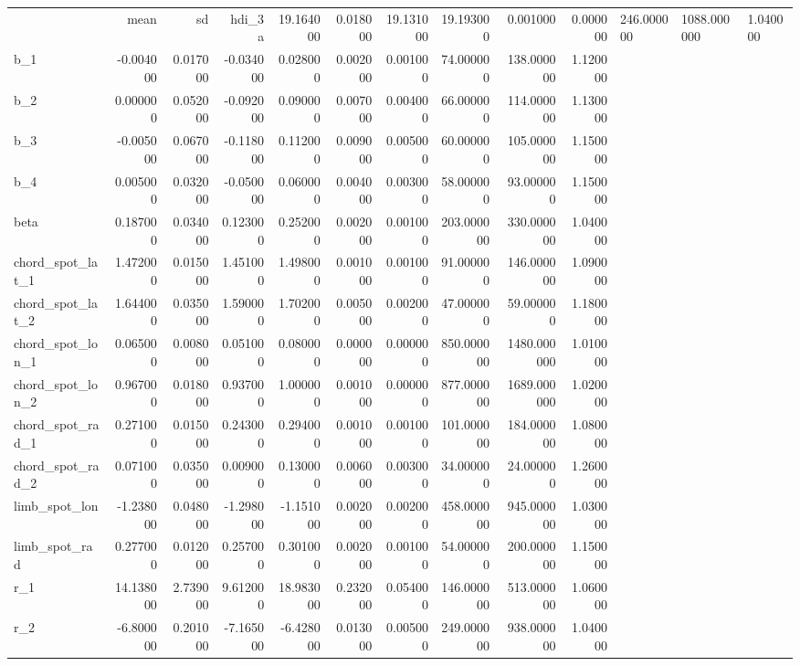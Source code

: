 \begin{tabular}{lrrrrrrrrr}
\toprule
 & mean & sd & hdi_3%
\midrule
a & 19.164000 & 0.018000 & 19.131000 & 19.193000 & 0.001000 & 0.000000 & 246.000000 & 1088.000000 & 1.040000 \\
b_1 & -0.004000 & 0.017000 & -0.034000 & 0.028000 & 0.002000 & 0.001000 & 74.000000 & 138.000000 & 1.120000 \\
b_2 & 0.000000 & 0.052000 & -0.092000 & 0.090000 & 0.007000 & 0.004000 & 66.000000 & 114.000000 & 1.130000 \\
b_3 & -0.005000 & 0.067000 & -0.118000 & 0.112000 & 0.009000 & 0.005000 & 60.000000 & 105.000000 & 1.150000 \\
b_4 & 0.005000 & 0.032000 & -0.050000 & 0.060000 & 0.004000 & 0.003000 & 58.000000 & 93.000000 & 1.150000 \\
beta & 0.187000 & 0.034000 & 0.123000 & 0.252000 & 0.002000 & 0.001000 & 203.000000 & 330.000000 & 1.040000 \\
chord_spot_lat_1 & 1.472000 & 0.015000 & 1.451000 & 1.498000 & 0.001000 & 0.001000 & 91.000000 & 146.000000 & 1.090000 \\
chord_spot_lat_2 & 1.644000 & 0.035000 & 1.590000 & 1.702000 & 0.005000 & 0.002000 & 47.000000 & 59.000000 & 1.180000 \\
chord_spot_lon_1 & 0.065000 & 0.008000 & 0.051000 & 0.080000 & 0.000000 & 0.000000 & 850.000000 & 1480.000000 & 1.010000 \\
chord_spot_lon_2 & 0.967000 & 0.018000 & 0.937000 & 1.000000 & 0.001000 & 0.000000 & 877.000000 & 1689.000000 & 1.020000 \\
chord_spot_rad_1 & 0.271000 & 0.015000 & 0.243000 & 0.294000 & 0.001000 & 0.001000 & 101.000000 & 184.000000 & 1.080000 \\
chord_spot_rad_2 & 0.071000 & 0.035000 & 0.009000 & 0.130000 & 0.006000 & 0.003000 & 34.000000 & 24.000000 & 1.260000 \\
limb_spot_lon & -1.238000 & 0.048000 & -1.298000 & -1.151000 & 0.002000 & 0.002000 & 458.000000 & 945.000000 & 1.030000 \\
limb_spot_rad & 0.277000 & 0.012000 & 0.257000 & 0.301000 & 0.002000 & 0.001000 & 54.000000 & 200.000000 & 1.150000 \\
r_1 & 14.138000 & 2.739000 & 9.612000 & 18.983000 & 0.232000 & 0.054000 & 146.000000 & 513.000000 & 1.060000 \\
r_2 & -6.800000 & 0.201000 & -7.165000 & -6.428000 & 0.013000 & 0.005000 & 249.000000 & 938.000000 & 1.040000 \\

\end{tabular}
